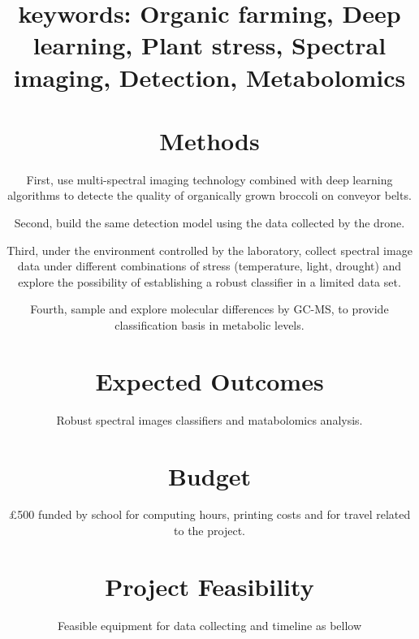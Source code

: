 \documentclass[11pt]{article}
\begin{document}
\title{\textbf{keywords:} Organic farming, Deep learning, Plant stress, Spectral imaging, Detection, Metabolomics

\section*{Methods}
\begin{linenumbers}
First, use multi-spectral imaging technology combined with deep learning algorithms to detecte the quality of organically grown broccoli on conveyor belts. 

Second, build the same detection model using the data collected by the drone.

Third, under the environment controlled by the laboratory, collect spectral image data under different combinations of stress (temperature, light, drought) and explore the possibility of establishing a robust classifier in a limited data set. 

Fourth, sample and explore molecular differences by GC-MS, to provide classification basis in metabolic levels. 
\end{linenumbers}

\section*{Expected Outcomes}
\begin{linenumbers}
Robust spectral images classifiers and matabolomics analysis.
\end{linenumbers}

\section*{Budget}
\begin{linenumbers}
\pounds 500 funded by school for computing hours, printing costs and for travel related to the project.
\end{linenumbers}

\section*{Project Feasibility}
\begin{linenumbers}
Feasible equipment for data collecting and timeline as bellow
\end{linenumbers}


}
\end{document}
